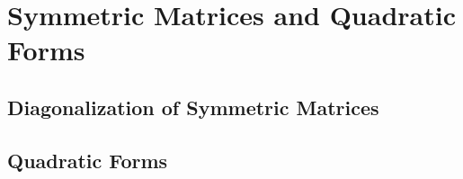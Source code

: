 \documentclass[../linalg.tex]{subfiles}
\begin{document}
\chapter{Symmetric Matrices and Quadratic Forms}
\section{Diagonalization of Symmetric Matrices}
\section{Quadratic Forms}
\end{document}
